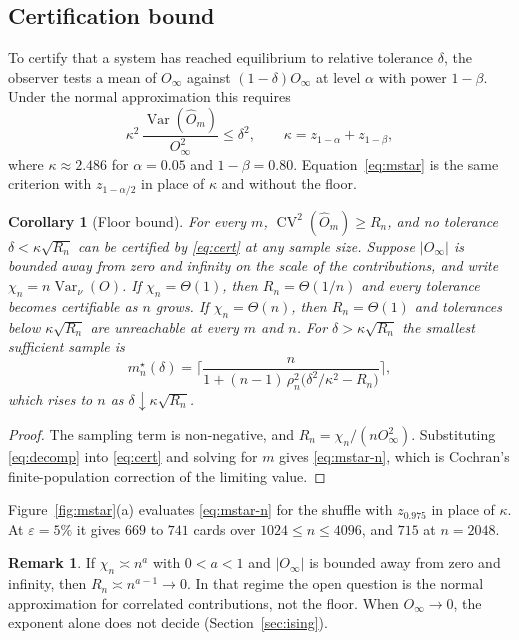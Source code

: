 \documentclass[ba]{imsart}
\theoremstyle{plain}
\newtheorem{corollary}[theorem]{Corollary}
\theoremstyle{definition}
\newtheorem{remark}[theorem]{Remark}
\newcommand{\Var}{\operatorname{Var}}
\newcommand{\CV}{\operatorname{CV}}
\newcommand{\Oh}{\widehat{O}}
\begin{document}
\subsection{Certification bound}

To certify that a system has reached equilibrium to relative tolerance $\delta$, the observer tests a mean of $O_\infty$ against $(1-\delta)O_\infty$ at level $\alpha$ with power $1-\beta$. Under the normal approximation this requires
\begin{equation}\label{eq:cert}
\kappa^2\,\frac{\Var(\Oh_m)}{O_\infty^2}\le\delta^2,\qquad\kappa=z_{1-\alpha}+z_{1-\beta},
\end{equation}
where $\kappa\approx2.486$ for $\alpha=0.05$ and $1-\beta=0.80$. Equation~\eqref{eq:mstar} is the same criterion with $z_{1-\alpha/2}$ in place of $\kappa$ and without the floor.

\begin{corollary}[Floor bound]\label{cor:floor}
For every $m$, $\CV^2(\Oh_m)\ge R_n$, and no tolerance $\delta<\kappa\sqrt{R_n}$ can be certified by \eqref{eq:cert} at any sample size. Suppose $|O_\infty|$ is bounded away from zero and infinity on the scale of the contributions, and write $\chi_n=n\Var_\nu(O)$. If $\chi_n=\Theta(1)$, then $R_n=\Theta(1/n)$ and every tolerance becomes certifiable as $n$ grows. If $\chi_n=\Theta(n)$, then $R_n=\Theta(1)$ and tolerances below $\kappa\sqrt{R_n}$ are unreachable at every $m$ and $n$. For $\delta>\kappa\sqrt{R_n}$ the smallest sufficient sample is
\begin{equation}\label{eq:mstar-n}
m_n^\star(\delta)=\biggl\lceil\frac{n}{1+(n-1)\,\rho_n^2\bigl(\delta^2/\kappa^2-R_n\bigr)}\biggr\rceil,
\end{equation}
which rises to $n$ as $\delta\downarrow\kappa\sqrt{R_n}$.
\end{corollary}

\begin{proof}
The sampling term is non-negative, and $R_n=\chi_n/(nO_\infty^2)$. Substituting \eqref{eq:decomp} into \eqref{eq:cert} and solving for $m$ gives \eqref{eq:mstar-n}, which is Cochran's finite-population correction of the limiting value.
\end{proof}

Figure~\ref{fig:mstar}(a) evaluates \eqref{eq:mstar-n} for the shuffle with $z_{0.975}$ in place of $\kappa$. At $\varepsilon=5\%$ it gives $669$ to $741$ cards over $1024\le n\le4096$, and $715$ at $n=2048$.

\begin{remark}\label{rem:subext}
If $\chi_n\asymp n^a$ with $0<a<1$ and $|O_\infty|$ is bounded away from zero and infinity, then $R_n\asymp n^{a-1}\to0$. In that regime the open question is the normal approximation for correlated contributions, not the floor. When $O_\infty\to0$, the exponent alone does not decide (Section~\ref{sec:ising}).
\end{remark}
\end{document}
